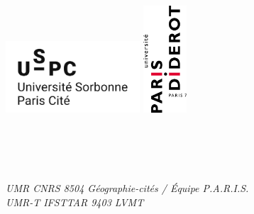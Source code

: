 \begin{titlepage}


\begin{addmargin}[-1cm]{-3cm}
\begin{center}
\large

\hfill


\vspace{-1.5cm}
\includegraphics[width=5cm]{Figures/Art/logouspc.png}
\hfill
\includegraphics[height=4cm]{Figures/Art/Logo-P7.png}

\vspace{0.5cm}

\begingroup
{}\\\medskip
{}\\\medskip
{}\\\medskip
{}\\\vspace{0.5cm}
\textit{UMR CNRS 8504 Géographie-cités / Équipe P.A.R.I.S.}\\
\textit{UMR-T IFSTTAR 9403 LVMT}
\endgroup



\vspace{1.5cm}

\begingroup
\textbf{\spacedallcaps{\myTitle}} \\ \bigskip %
\endgroup

\vspace{1.5cm}





\end{center}
\end{addmargin}
\end{titlepage}
